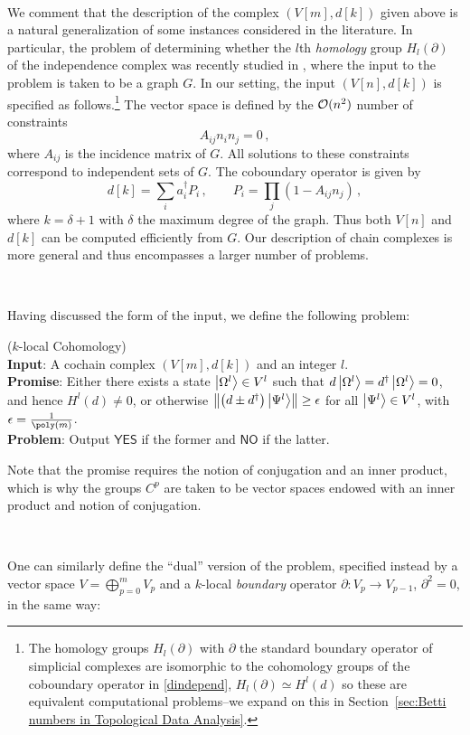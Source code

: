 \documentclass[11pt]{article}
\numberwithin{equation}{section}
\def\cO{{\cal O}}
\newcommand{\yes}{\mathsf{YES}}
\newcommand{\no}{\mathsf{NO}}
\newcommand\equ[1] {\begin{equation}#1\end{equation}}
\renewcommand\( {\left(}
\renewcommand\) {\right)}
\newcounter{mycount}
\newcommand\mypromprob[4]{%
   \stepcounter{mycount}
 \par\noindent  {\bfseries Definition\  \themycount} (#1)\\
   {\bfseries Input}: #2\\
   {\bfseries Promise}: #3\\
   {\bfseries Problem}: #4\par
}
\begin{document}
\ 

We comment that the description of the complex $(V[m],d[k])$ given above is a natural generalization of some instances considered in the literature. In particular, the problem of determining whether the $l$th {\it homology} group $H_l(\partial)$ of the independence complex was recently studied in  \cite{ADAMASZEK20168}, where the input to the problem is taken to be a graph $G$. In our setting, the input $(V[n],d[k]) $ is specified as follows.\footnote{The homology groups $H_l(\partial)$ with $\partial$ the standard boundary operator of simplicial complexes are isomorphic to the cohomology groups of the coboundary operator in \eqref{dindepend}, $H_l(
\partial)\simeq H^l(d)$ so these are equivalent computational problems--we expand on this in Section~\ref{sec:Betti numbers in Topological Data Analysis}. }  The vector space is defined by the $\cO(n^2)$ number of constraints
\equ{
A_{ij}n_i n_j=0\,,
}
where $A_{ij}$ is the incidence matrix of $G$. All solutions to these constraints correspond to independent sets of $G$. The coboundary operator is given by
\equ{\label{dindepend}
d[k]=\sum_i a_i^\dagger P_i\,,\qquad P_i=\prod_{j} (1-A_{ij}n_j)\,,
}
where $k=\delta+1$  with $\delta$ the maximum degree of the graph. Thus both $V[n]$ and $d[k]$ can be computed efficiently from $G$. Our description of chain complexes is more general and thus encompasses a larger number of problems.  

\ 

Having discussed the form of the input, we define the following problem:\\
\mypromprob{{\sc $k$-local Cohomology}}{A cochain complex $(V[m],d[k])$ and an integer $l$.}{Either there exists a state $\ket{\Omega^{l}}\in V^{l}$ such that $d\ket{\Omega^{l}}=d^{\dagger}\ket{\Omega^{l}}=0$, and hence $H^l(d)\neq 0$, or otherwise $\norm{\(d\pm d^{\dagger}\)\ket{\Psi^{l}}}\geq \epsilon$ for all $\ket{\Psi^{l}}\in V^{l}$, with  $\epsilon=\frac{1}{\poly(m)}$.}{Output $\yes$ if the former and $\no$ if the latter.\\}

 
 
 
\noindent Note that the promise requires the notion of conjugation and an inner product, which is why the groups $C^{p}$ are taken to be vector spaces endowed with an inner product and notion of conjugation.  

\ 

One can similarly define the ``dual'' version of the problem, specified instead by a vector space $V=\bigoplus_{p=0}^m V_p$ and a  $k$-local {\it boundary} operator $\partial: V_p\to V_{p-1}$, $\partial^2=0$, in the same way:\\
\end{document}
